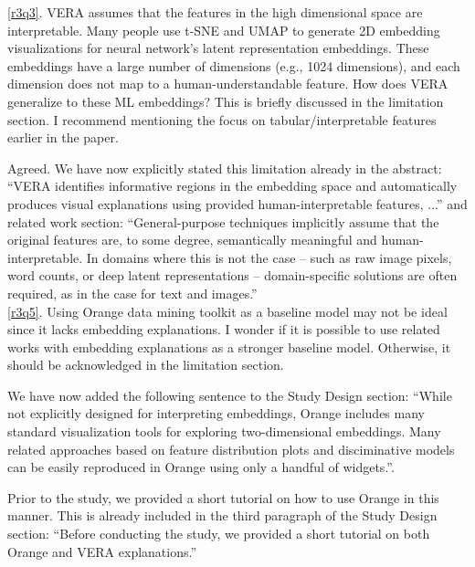 \documentclass{article}
\newcounter{rtaskno}
\newcommand{\rtask}[1]{\refstepcounter{rtaskno}\label{#1}}
\newcommand{\reviewc}[2]{\begin{leftbar}\noindent\rtask{#1}\ref{#1}. #2\end{leftbar}}
\newcommand{\answer}[1]{\noindent #1\\[0mm]}
\newlength{\leftbarwidth}
\newlength{\leftbarsep}
\renewenvironment{leftbar}{%
    \def\FrameCommand{{\color{black}{\vrule width \leftbarwidth\relax\hspace {\leftbarsep}}}}%
    \MakeFramed {\advance \hsize -\width \FrameRestore }%
}{\endMakeFramed}
\begin{document}
\reviewc{r3q3}{VERA assumes that the features in the high dimensional space are interpretable. Many people use t-SNE and UMAP to generate 2D embedding visualizations for neural network's latent representation embeddings. These embeddings have a large number of dimensions (e.g., 1024 dimensions), and each dimension does not map to a human-understandable feature. How does VERA generalize to these ML embeddings? This is briefly discussed in the limitation section. I recommend mentioning the focus on tabular/interpretable features earlier in the paper.}

\answer{Agreed. We have now explicitly stated this limitation already in the abstract: ``VERA identifies informative regions in the embedding space and automatically produces visual explanations using provided human-interpretable features, ...'' and related work section: ``General-purpose techniques implicitly assume that the original features are, to some degree, semantically meaningful and human-interpretable. In domains where this is not the case – such as raw image pixels, word counts, or deep latent representations – domain-specific solutions are often required, as in the case for text and images.''}





\reviewc{r3q5}{Using Orange data mining toolkit as a baseline model may not be ideal since it lacks embedding explanations. I wonder if it is possible to use related works with embedding explanations as a stronger baseline model. Otherwise, it should be acknowledged in the limitation section.}

\answer{We have now added the following sentence to the Study Design section: ``While not explicitly designed for interpreting embeddings, Orange includes many standard visualization tools for exploring two-dimensional embeddings. Many related approaches based on feature distribution plots and disciminative models can be easily reproduced in Orange using only a handful of widgets.''.

Prior to the study, we provided a short tutorial on how to use Orange in this manner. This is already included in the third paragraph of the Study Design section: ``Before conducting the study, we provided a short tutorial on both Orange and VERA explanations.''}





%
%
\end{document}

